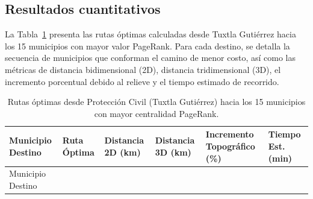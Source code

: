 \documentclass[
  spanish,
  us-letterpaper,
]{scrreprt}
\numberwithin{equation}{section}
\begin{document}
\subsection{Resultados cuantitativos}\label{resultados-cuantitativos}

La Tabla~\ref{tbl-rutas-optimas} presenta las rutas óptimas calculadas
desde Tuxtla Gutiérrez hacia los 15 municipios con mayor valor PageRank.
Para cada destino, se detalla la secuencia de municipios que conforman
el camino de menor costo, así como las métricas de distancia
bidimensional (2D), distancia tridimensional (3D), el incremento
porcentual debido al relieve y el tiempo estimado de recorrido.

\begin{longtable}[]{@{}
  >{\raggedright\arraybackslash}p{}
  >{\raggedright\arraybackslash}p{}
  >{\raggedleft\arraybackslash}p{}
  >{\raggedleft\arraybackslash}p{}
  >{\raggedleft\arraybackslash}p{}
  >{\raggedleft\arraybackslash}p{}@{}}
\caption{Rutas óptimas desde Protección Civil (Tuxtla Gutiérrez) hacia
los 15 municipios con mayor centralidad
PageRank.}\label{tbl-rutas-optimas}\tabularnewline
\toprule\noalign{}
\begin{minipage}[b]{\linewidth}\raggedright
Municipio Destino
\end{minipage} & \begin{minipage}[b]{\linewidth}\raggedright
Ruta Óptima
\end{minipage} & \begin{minipage}[b]{\linewidth}\raggedleft
Distancia 2D (km)
\end{minipage} & \begin{minipage}[b]{\linewidth}\raggedleft
Distancia 3D (km)
\end{minipage} & \begin{minipage}[b]{\linewidth}\raggedleft
Incremento Topográfico (\%)
\end{minipage} & \begin{minipage}[b]{\linewidth}\raggedleft
Tiempo Est. (min)
\end{minipage} \\
\midrule\noalign{}
\endfirsthead
\toprule\noalign{}
\begin{minipage}[b]{\linewidth}\raggedright
Municipio Destino
\end{minipage} & \begin{minipage}[b]{\linewidth}\raggedright

\end{minipage}
\end{longtable}
\end{document}
